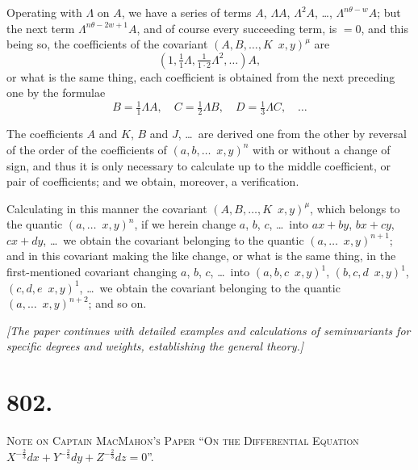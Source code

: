 \documentclass[11pt,a4paper]{article}
\theoremstyle{definition}
\theoremstyle{remark}
\begin{document}
Operating with $\Lambda$ on $A$, we have a series of terms $A$, $\Lambda A$, $\Lambda^2 A$, \ldots, $\Lambda^{n\theta - w} A$; but the next term $\Lambda^{n\theta - 2w + 1} A$, and of course every succeeding term, is $=0$, and this being so, the coefficients of the covariant $(A, B, \ldots, K \!\!\!\! \,\,\, x, y)^\mu$ are
\[
(1, \tfrac{1}{1}\Lambda, \tfrac{1}{1 \cdot 2}\Lambda^2, \ldots) A,
\]
or what is the same thing, each coefficient is obtained from the next preceding one by the formulae
\[
B = \tfrac{1}{1}\Lambda A, \quad C = \tfrac{1}{2}\Lambda B, \quad D = \tfrac{1}{3}\Lambda C, \quad \ldots
\]

The coefficients $A$ and $K$, $B$ and $J$, \ldots\ are derived one from the other by reversal of the order of the coefficients of $(a, b, \ldots \!\!\!\! \,\,\, x, y)^n$ with or without a change of sign, and thus it is only necessary to calculate up to the middle coefficient, or pair of coefficients; and we obtain, moreover, a verification.

Calculating in this manner the covariant $(A, B, \ldots, K \!\!\!\! \,\,\, x, y)^\mu$, which belongs to the quantic $(a, \ldots \!\!\!\! \,\,\, x, y)^n$, if we herein change $a$, $b$, $c$, \ldots\ into $ax + by$, $bx + cy$, $cx + dy$, \ldots\ we obtain the covariant belonging to the quantic $(a, \ldots \!\!\!\! \,\,\, x, y)^{n+1}$; and in this covariant making the like change, or what is the same thing, in the first-mentioned covariant changing $a$, $b$, $c$, \ldots\ into $(a, b, c \!\!\!\! \,\,\, x, y)^1$, $(b, c, d \!\!\!\! \,\,\, x, y)^1$, $(c, d, e \!\!\!\! \,\,\, x, y)^1$, \ldots\ we obtain the covariant belonging to the quantic $(a, \ldots \!\!\!\! \,\,\, x, y)^{n+2}$; and so on.

\vspace{0.5cm}
\noindent\textit{[The paper continues with detailed examples and calculations of seminvariants for specific degrees and weights, establishing the general theory.]}
\vspace{0.5cm}



\newpage
\section*{802.}
\begin{center}
{\large\scshape Note on Captain MacMahon's Paper ``On the Differential Equation}\\
{\large\scshape $X^{-\frac{2}{3}}dx + Y^{-\frac{2}{3}}dy + Z^{-\frac{2}{3}}dz = 0$''.}
\end{center}
\end{document}

